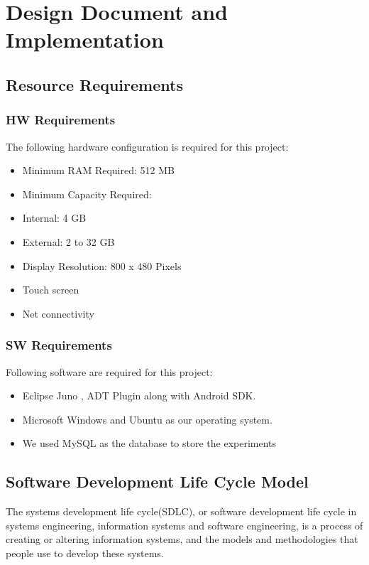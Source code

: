\documentclass[12pt]{report}
\begin{document}
\chapter{Design Document and Implementation}
\section{Resource Requirements}
\subsection{HW Requirements}
The following hardware configuration is required for this project: 
\begin{itemize}
\item Minimum RAM Required: 512 MB 
\item Minimum Capacity Required: 
\item Internal: 4 GB 
\item External: 2 to 32 GB 
\item Display Resolution: 800 x 480 Pixels 
\item Touch screen 
\item Net connectivity
\end{itemize}
\subsection{SW Requirements}
Following software are required for this project: 
\begin{itemize}
\item Eclipse Juno , ADT Plugin along with Android SDK. 
\item Microsoft Windows and Ubuntu as our operating system.
\item We used MySQL  as the database to store the experiments 
\end{itemize}

\section{Software Development Life Cycle Model}
The systems development life cycle(SDLC), or software development life cycle in systems 
engineering, information systems and software engineering, is a process of creating or 
altering information systems, and the models and methodologies that people use to develop 
these systems. 
\\
\\
\end{document}
